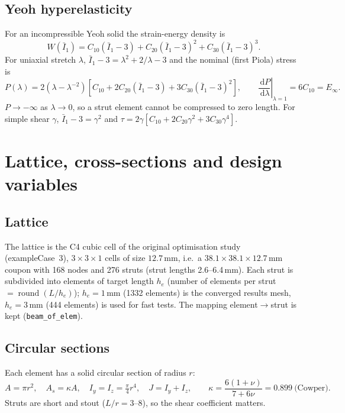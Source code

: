 \documentclass[11pt,a4paper]{article}
\newcommand{\dd}{\,\mathrm{d}}
\begin{document}
\subsection{Yeoh hyperelasticity}
For an incompressible Yeoh solid the strain-energy density is
\begin{equation}
W(\bar I_1) = C_{10}(\bar I_1-3) + C_{20}(\bar I_1-3)^2 + C_{30}(\bar I_1-3)^3 .
\end{equation}
For uniaxial stretch $\lambda$, $\bar I_1 - 3 = \lambda^2 + 2/\lambda - 3$ and the nominal (first Piola) stress is
\begin{equation}
P(\lambda) = 2\left(\lambda - \lambda^{-2}\right)\left[C_{10} + 2C_{20}(\bar I_1-3) + 3C_{30}(\bar I_1-3)^2\right],
\qquad \left.\frac{\dd P}{\dd\lambda}\right|_{\lambda=1} = 6C_{10} = E_\infty .
\label{eq:yeoh-uniaxial}
\end{equation}
$P\to-\infty$ as $\lambda\to 0$, so a strut element cannot be compressed to zero length.
For simple shear $\gamma$, $\bar I_1 - 3 = \gamma^2$ and $\tau = 2\gamma\left[C_{10}+2C_{20}\gamma^2+3C_{30}\gamma^4\right]$.

\section{Lattice, cross-sections and design variables}
\label{sec:geometry}
\subsection{Lattice}
The lattice is the C4 cubic cell of the original optimisation study (exampleCase~3), $3\times3\times1$ cells of
size $12.7$\,mm, i.e.\ a $38.1\times38.1\times12.7$\,mm coupon with 168 nodes and 276 struts (strut lengths
2.6--6.4\,mm). Each strut is subdivided into elements of target length $h_e$ (number of elements per strut
$=\operatorname{round}(L/h_e)$); $h_e=1$\,mm (1332 elements) is the converged results mesh, $h_e=3$\,mm
(444 elements) is used for fast tests. The mapping element$\to$strut is kept (\texttt{beam\_of\_elem}).

\subsection{Circular sections}
Each element has a solid circular section of radius $r$:
\begin{equation}
A = \pi r^2,\quad A_{s} = \kappa A,\quad I_y = I_z = \tfrac{\pi}{4}r^4,\quad J = I_y + I_z,\qquad
\kappa = \frac{6(1+\nu)}{7+6\nu} = 0.899 \ \text{(Cowper)} .
\end{equation}
Struts are short and stout ($L/r = 3$--$8$), so the shear coefficient matters.
\end{document}
